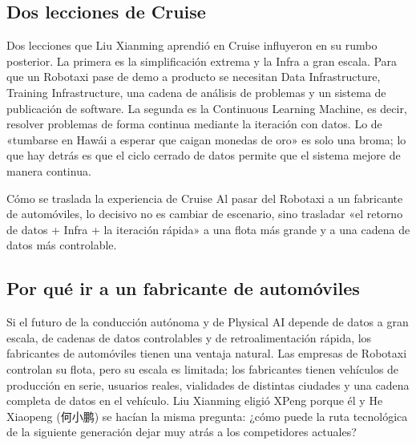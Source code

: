 \documentclass[a4paper]{article}
\begin{document}
\subsection{Dos lecciones de Cruise}

Dos lecciones que Liu Xianming aprendió en Cruise influyeron en su rumbo posterior. La primera es la simplificación extrema y la Infra a gran escala. Para que un Robotaxi pase de demo a producto se necesitan Data Infrastructure, Training Infrastructure, una cadena de análisis de problemas y un sistema de publicación de software. La segunda es la Continuous Learning Machine, es decir, resolver problemas de forma continua mediante la iteración con datos. Lo de «tumbarse en Hawái a esperar que caigan monedas de oro» es solo una broma; lo que hay detrás es que el ciclo cerrado de datos permite que el sistema mejore de manera continua.

\begin{importantbox}{Cómo se traslada la experiencia de Cruise}
Al pasar del Robotaxi a un fabricante de automóviles, lo decisivo no es cambiar de escenario, sino trasladar «el retorno de datos + Infra + la iteración rápida» a una flota más grande y a una cadena de datos más controlable.
\end{importantbox}

\subsection{Por qué ir a un fabricante de automóviles}

Si el futuro de la conducción autónoma y de Physical AI depende de datos a gran escala, de cadenas de datos controlables y de retroalimentación rápida, los fabricantes de automóviles tienen una ventaja natural. Las empresas de Robotaxi controlan su flota, pero su escala es limitada; los fabricantes tienen vehículos de producción en serie, usuarios reales, vialidades de distintas ciudades y una cadena completa de datos en el vehículo. Liu Xianming eligió XPeng porque él y He Xiaopeng (何小鹏) se hacían la misma pregunta: ¿cómo puede la ruta tecnológica de la siguiente generación dejar muy atrás a los competidores actuales?
\end{document}
